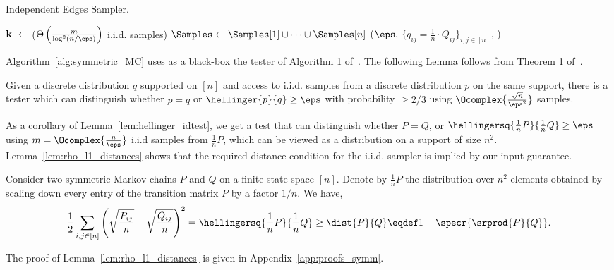\begin{algorithm}[H]
\caption{Independent Edges Sampler.}
\label{alg:symmetric_MC}
\BlankLine
$\mathbf{k}~\leftarrow$ \Histogram ($\Theta\left(\frac{m}{\log^2 (n/\eps)}\right)$ i.i.d. \Uniform[n] samples) \;
{
$\Samples\leftarrow\Samples[1]\cup\dots\cup\Samples[n]$\;
\KwRet \IdentityTest($\eps,$ $\{q_{ij}=\frac{1}{n}\cdot Q_{ij}\}_{i,j\in[n]}$, \Samples)\;
}
\end{algorithm}

Algorithm~\ref{alg:symmetric_MC} uses as a black-box the tester of Algorithm 1 of~\cite{DaskalakisKW17}. The following Lemma follows from Theorem 1 of~\cite{DaskalakisKW17}. %
\begin{lemma}
\label{lem:hellinger_idtest}
Given a discrete distribution $q$ supported on $[n]$ and access to i.i.d. samples from a discrete distribution $p$ on the same support, there is a tester which can distinguish whether $p=q$ or $\hellinger{p}{q} \ge \eps$ with probability $\ge 2/3$ using $\Ocomplex{\frac{\sqrt{n}}{\eps^2}}$ samples.
\end{lemma}
As a corollary of Lemma~\ref{lem:hellinger_idtest}, we get a test that can distinguish whether $P=Q$, or $\hellingersq{\frac{1}{n}P}{\frac{1}{n}Q}\ge\eps$ using $m=\Ocomplex{\frac{n}{\eps}}$ i.i.d samples from $\frac{1}{n}P$, which can be viewed as a distribution on a support of size $n^2$. Lemma~\ref{lem:rho_l1_distances} shows that the required distance condition for the i.i.d. sampler is implied by our input guarantee. %

\begin{lemma}
	Consider two symmetric Markov chains $P$ and $Q$ on a finite state space $[n]$. Denote by $\frac{1}{n}P$ the distribution over $n^2$ elements obtained by scaling down every entry of the transition matrix $P$ by a factor $1/n$. We have,
\begin{align}
\frac{1}{2}\sum\limits_{i,j\in[n]}\left(\sqrt{\frac{P_{ij}}{n}}-\sqrt{\frac{Q_{ij}}{n}}\right)^2=
\hellingersq{\frac{1}{n}P}{\frac{1}{n}Q}\ge\dist{P}{Q}\eqdef 1-\specr{\srprod{P}{Q}} .
\end{align}
\label{lem:rho_l1_distances}
\end{lemma}
The proof of Lemma~\ref{lem:rho_l1_distances} is given in Appendix~\ref{app:proofs_symm}.

